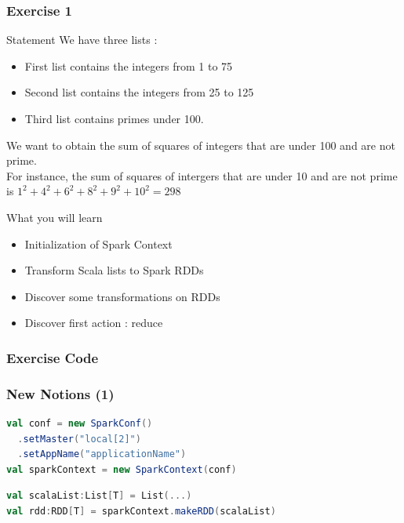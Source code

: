 \documentclass[slidetop,9pt,utf8]{beamer}
\begin{document}
\begin{frame}
  \frametitle{Exercise 1}

  \begin{block}{Statement}
    We have three lists : 
    \begin{itemize}
      \item First list contains the integers from 1 to 75
      \item Second list contains the integers from 25 to 125
      \item Third list contains primes under 100. 
    \end{itemize}
    We want to obtain the sum of squares of integers that are under 100 and are not prime.
    \\ \medskip
    For instance, the sum of squares of intergers that are under 10 and are not prime is
    $1^{2} + 4^{2} + 6^{2} + 8^{2} + 9^{2} + 10^{2} = 298$
  \end{block}

  \begin{block}{What you will learn}
    \begin{itemize}
      \item Initialization of Spark Context
      \item Transform Scala lists to Spark RDDs
      \item Discover some transformations on RDDs
      \item Discover first action : reduce
    \end{itemize}
  \end{block}

\end{frame}

\begin{frame}
  \frametitle{Exercise Code}

  

\end{frame}

\begin{frame}[fragile]
  \frametitle{New Notions (1)}

  \begin{lstlisting}[label=InitSparkContext, caption=Init Spark Context, language=scala, style=code]
val conf = new SparkConf()
  .setMaster("local[2]")
  .setAppName("applicationName")
val sparkContext = new SparkContext(conf)
  \end{lstlisting}

  \begin{lstlisting}[label=ListToRdd, caption=Load List as RDD, language=scala, style=code]
val scalaList:List[T] = List(...)
val rdd:RDD[T] = sparkContext.makeRDD(scalaList)
  \end{lstlisting}

\end{frame}
\end{document}

